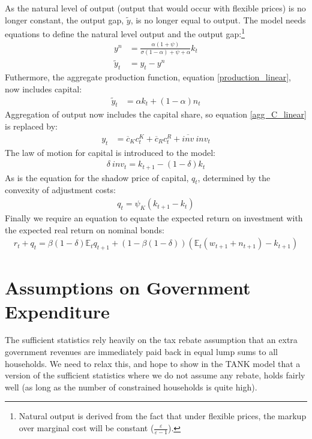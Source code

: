 \documentclass[titlepage]{\econtex}\newcommand{\texname}{ConsumptionHeterogeneity}
\begin{document}
As the natural level of output (output that would occur with flexible prices) is no longer constant, the output gap, $\tilde{y}$, is no longer equal to output. The model needs equations to define the natural level output and the output gap:\footnote{Natural output is derived from the fact that under flexible prices, the markup over marginal cost will be constant ($\frac{\varepsilon}{\varepsilon-1}$).}
\begin{align}
y^{n} &= \frac{\alpha(1+\psi)}{\sigma(1-\alpha) + \psi + \alpha} k_{t} \label{y_nat_linear} \\
\tilde{y}_t &= y_t - y^{n}	\label{output_gap_linear}
\end{align}
Futhermore, the aggregate production function, equation \ref{production_linear}, now includes capital:
\begin{align}
\tilde{y}_t &= \alpha k_t +  (1-\alpha)n_t  \label{production_capital_linear}
\end{align}
Aggregation of output now includes the capital share, so equation \ref{agg_C_linear} is replaced by:
\begin{align}
y_t &= \overline{c}_{K} c^K_t + \overline{c}_{R} c^R_t + \overline{\textit{inv}} \ \textit{inv}_t \label{agg_Y_linear}
\end{align}
The law of motion for capital is introduced to the model:
\begin{align}
\delta \ \textit{inv}_t = k_{t+1} - (1-\delta) k_{t}    \label{lom_capital}
\end{align}
As is the equation for the shadow price of capital, $q_t$, determined by the convexity of adjustment costs:
\begin{align}
q_t = \psi_K (k_{t+1}-k_t)	\label{shadow_K}
\end{align}
Finally we require an equation to equate the expected return on investment with the expected real return on nominal bonds:
\begin{align}
r_t + q_t = \beta (1-\delta) \mathbb{E}_t q_{t+1} + (1 - \beta (1-\delta)) (\mathbb{E}_t (w_{t+1} + n_{t+1}) - k_{t+1})	\label{return_K}
\end{align}





\section{Assumptions on Government Expenditure}
The sufficient statistics rely heavily on the tax rebate assumption that an extra government revenues are immediately paid back in equal lump sums to all households. We need to relax this, and hope to show in the TANK model that a version of the sufficient statistics where we do not assume any rebate, holds fairly well (as long as the number of constrained households is quite high).
\end{document}
